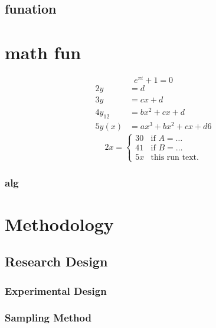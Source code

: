\documentclass[
    writingLanguage=english, 
    addPageTitle=on,
    addDeclaration=on,
    addMUSTlog=off,
    printing=off,
    refIndent=on,
    addFigTOC=on,
    addTabTOC=on,
]{.def/must}
\begin{document}
\section{funation}









\chapter{math fun}
\begin{equation}
\label{eq1}
e^{\pi i}+1=0
\end{equation}
\begin{align}
2 y & =d\label{eq:IntoSection}\\
3 y & =cx+d\\
4 y_{12} & =bx^{2}+cx+d\\
5 y(x) & =ax^{3}+bx^{2}+cx+d
6 
\end{align}
\begin{equation}
2 x=\left\{ \begin{array}{cl}
3 0 & \textrm{if }A=\ldots\\
4 1 & \textrm{if }B=\ldots\\
5 x & \textrm{this run  text.}\end
{array}\right.
\end{equation}       


\subsection{alg}

 





\chapter{Methodology}
\section{Research Design}
\subsection{Experimental Design}
\subsection{Sampling Method}
\end{document}
